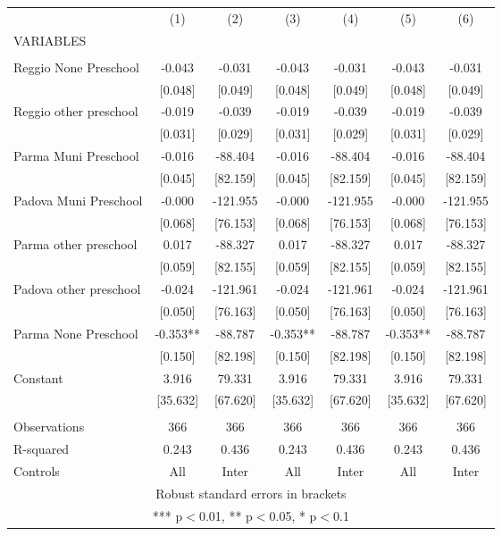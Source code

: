 \begin{tabular}{lcccccc} \hline
 & (1) & (2) & (3) & (4) & (5) & (6) \\
VARIABLES &  &  &  &  &  &  \\ \hline
 &  &  &  &  &  &  \\
Reggio None Preschool & -0.043 & -0.031 & -0.043 & -0.031 & -0.043 & -0.031 \\
 & [0.048] & [0.049] & [0.048] & [0.049] & [0.048] & [0.049] \\
Reggio other preschool & -0.019 & -0.039 & -0.019 & -0.039 & -0.019 & -0.039 \\
 & [0.031] & [0.029] & [0.031] & [0.029] & [0.031] & [0.029] \\
Parma Muni Preschool & -0.016 & -88.404 & -0.016 & -88.404 & -0.016 & -88.404 \\
 & [0.045] & [82.159] & [0.045] & [82.159] & [0.045] & [82.159] \\
Padova Muni Preschool & -0.000 & -121.955 & -0.000 & -121.955 & -0.000 & -121.955 \\
 & [0.068] & [76.153] & [0.068] & [76.153] & [0.068] & [76.153] \\
Parma other preschool & 0.017 & -88.327 & 0.017 & -88.327 & 0.017 & -88.327 \\
 & [0.059] & [82.155] & [0.059] & [82.155] & [0.059] & [82.155] \\
Padova other preschool & -0.024 & -121.961 & -0.024 & -121.961 & -0.024 & -121.961 \\
 & [0.050] & [76.163] & [0.050] & [76.163] & [0.050] & [76.163] \\
Parma None Preschool & -0.353** & -88.787 & -0.353** & -88.787 & -0.353** & -88.787 \\
 & [0.150] & [82.198] & [0.150] & [82.198] & [0.150] & [82.198] \\
Constant & 3.916 & 79.331 & 3.916 & 79.331 & 3.916 & 79.331 \\
 & [35.632] & [67.620] & [35.632] & [67.620] & [35.632] & [67.620] \\
 &  &  &  &  &  &  \\
Observations & 366 & 366 & 366 & 366 & 366 & 366 \\
R-squared & 0.243 & 0.436 & 0.243 & 0.436 & 0.243 & 0.436 \\
 Controls & All & Inter & All & Inter & All & Inter \\ \hline
\multicolumn{7}{c}{ Robust standard errors in brackets} \\
\multicolumn{7}{c}{ *** p$<$0.01, ** p$<$0.05, * p$<$0.1} \\
\end{tabular}

